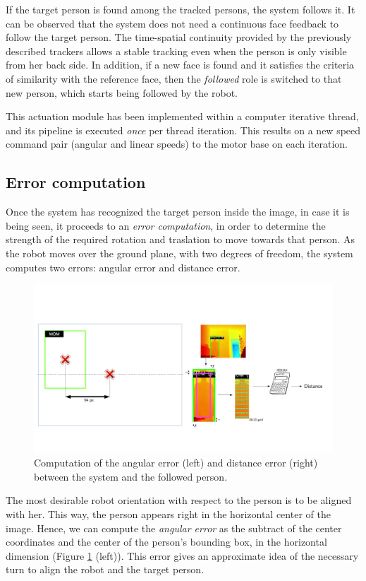 If the target person is found among the tracked persons, the system follows it. It can be observed that the system does not need a continuous face feedback to follow the target person. The time-spatial continuity provided by the previously described trackers allows a stable tracking even when the person is only visible from her back side. In addition, if a new face is found and it satisfies the criteria of similarity with the reference face, then the \emph{followed} role is switched to that new person, which starts being followed by the robot.

This actuation module has been implemented within a computer iterative thread, and its pipeline is executed \emph{once} per thread iteration. This results on a new speed command pair (angular and linear speeds) to the motor base on each iteration.

\subsection{Error computation}

Once the system has recognized the target person inside the image, in case it is being seen, it proceeds to an \emph{error computation}, in order to determine the strength of the required rotation and traslation to move towards that person. As the robot moves over the ground plane, with two degrees of freedom, the system computes two errors: angular error and distance error.

\begin{figure}
  \includegraphics[width=13cm]{images/errors}
  \caption{Computation of the angular error (left) and distance error (right) between the system and the followed person.}
  \label{fig:h_error}
\end{figure}

The most desirable robot orientation with respect to the person is to be aligned with her. This way, the person appears right in the horizontal center of the image. Hence, we can compute the \emph{angular error} as the subtract of the center coordinates and the center of the person's bounding box, in the horizontal dimension (Figure \ref{fig:h_error} (left)). This error gives an approximate idea of the necessary turn to align the robot and the target person.
	
